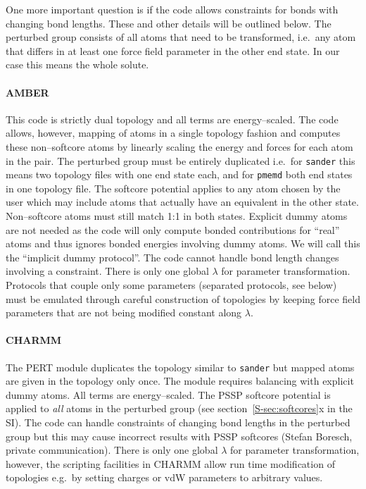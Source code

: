 \documentclass[journal=jctcce,manuscript=article]{achemso}
\newcommand{\progname}[1]{\texttt{#1}}
\begin{document}
One more important question is if the code allows constraints for bonds with 
changing bond lengths.  These and other details will be outlined below.  The 
perturbed group consists of all atoms that need to be transformed, i.e.\ any 
atom that differs in at least one force field parameter in the other end
state.  In our case this means the whole solute.%

\paragraph{AMBER} %
This code is strictly dual topology and all terms
are energy--scaled.
The code allows, however, mapping of atoms in a
single topology fashion and computes these non--softcore atoms 
by linearly scaling the energy and forces for each atom in the pair.
The perturbed group must be entirely duplicated i.e.\ for \progname{sander} 
this means two topology files with one end state each, and for \progname{pmemd} 
both end states in one topology file.  The softcore potential applies to any 
atom chosen by the user which may include atoms that actually have an 
equivalent in the other state.  Non--softcore atoms must still match 1:1 in 
both states.  Explicit dummy atoms are not needed as the code will only compute 
bonded contributions for ``real'' atoms and thus ignores bonded energies 
involving dummy atoms.  We will call this the ``implicit dummy protocol''. The 
code cannot handle bond length changes involving a constraint.  There is only 
one global $\lambda$ for parameter transformation.  Protocols that couple only 
some parameters (separated protocols, see below) must be emulated through 
careful construction of topologies by keeping force field parameters that are 
not being modified constant along $\lambda$.

\paragraph{CHARMM} The PERT module duplicates the topology similar to
\progname{sander} but mapped atoms are given in the topology only once.
The module requires balancing with explicit dummy atoms.  All terms are
energy--scaled.  The PSSP softcore potential is applied to \emph{all}
atoms in the perturbed group (see section~\ref{S-sec:softcores}x in the SI).  
The 
code can handle constraints of changing bond lengths in the perturbed group but 
this
may cause incorrect results with PSSP softcores (Stefan Boresch, private
communication).  There is only one global $\lambda$ for parameter
transformation, however, the scripting facilities in CHARMM allow run time
modification of topologies e.g.\ by setting charges or vdW parameters
to arbitrary values.
\end{document}
